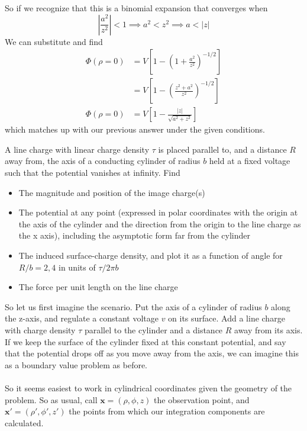 \documentclass{article}
\begin{document}
So if we recognize that this is a binomial expansion that converges when \[\left|\frac{a^{2}}{z^{2}}\right|<1 \implies a^{2} < z^{2} \implies a < |z| \]
We can substitute and find
\begin{align*}
\Phi(\rho=0) &= V\left[ 1 - \left( 1 + \frac{a^{2}}{z^{2}} \right)^{-1/2} \right]\\
&= V\left[ 1 - \left(\frac{z^{2}+a^{2}}{z^{2}} \right)^{-1/2} \right]\\
\Phi(\rho=0) &= \boxed{V\left[ 1 - \frac{|z|}{\sqrt{a^{2}+z^{2}}} \right]}
\end{align*}
which matches up with our previous answer under the given conditions.

\setcounter{problem}{10}
\begin{problem}
A line charge with linear charge density $\tau$ is placed parallel to, and a distance $R$ away from, the axis of a conducting cylinder of radius $b$ held at a fixed voltage such that the potential vanishes at infinity. Find
\begin{itemize}
\item The magnitude and position of the image charge(s)
\item The potential at any point (expressed in polar coordinates with the origin at the axis of the cylinder and the direction from the origin to the line charge as the x axis), including the asymptotic form far from the cylinder
\item The induced surface-charge density, and plot it as a function of angle for $R/b = 2,4$ in units of $\tau/2\pi b$
\item The force per unit length on the line charge
\end{itemize}
\end{problem}

So let us first imagine the scenario. Put the axis of a cylinder of radius $b$ along the z-axis, and regulate a constant voltage $v$ on its surface. Add a line charge with charge density $\tau$ parallel to the cylinder and a distance $R$ away from its axis. If we keep the surface of the cylinder fixed at this constant potential, and say that the potential drops off as you move away from the axis, we can imagine this as a boundary value problem as before.

\paragraph{}
So it seems easiest to work in cylindrical coordinates given the geometry of the problem. So as usual, call $\mathbf{x}=(\rho,\phi,z)$ the observation point, and $\mathbf{x'}=(\rho',\phi',z')$ the points from which our integration components are calculated.
\end{document}

